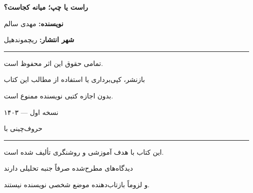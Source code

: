 \begin{titlepage}
\end{titlepage}

\frontmatter


\thispagestyle{empty}

\vspace*{\fill}

\begin{center}

{\Large\bfseries راست یا چپ؛ میانه کجاست؟}

\vspace{20pt}

\textbf{نویسنده:} مهدی سالم

\vspace{10pt}

\textbf{شهر انتشار:} ریچموندهیل

\vspace{30pt}

\rule{8cm}{0.5pt}

\vspace{20pt}

{\small
تمامی حقوق این اثر محفوظ است.

بازنشر، کپی‌برداری یا استفاده از مطالب این کتاب

بدون اجازه کتبی نویسنده ممنوع است.

\vspace{20pt}

نسخه اول — ۱۴۰۳

\vspace{20pt}

\textcolor{MediumGray}{حروف‌چینی با \XeLaTeX}
}

\vspace{30pt}

\rule{8cm}{0.5pt}

\vspace{20pt}

{\footnotesize
این کتاب با هدف آموزشی و روشنگری تألیف شده است.

دیدگاه‌های مطرح‌شده صرفاً جنبه تحلیلی دارند

و لزوماً بازتاب‌دهنده موضع شخصی نویسنده نیستند.
}

\end{center}


